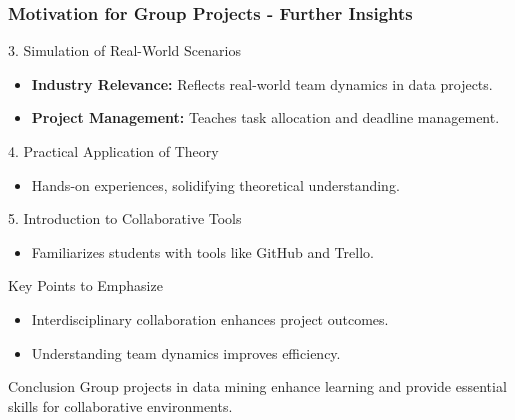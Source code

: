 \documentclass[aspectratio=169]{beamer}
\begin{document}
\begin{frame}[fragile]
    \frametitle{Motivation for Group Projects - Further Insights}
    \begin{block}{3. Simulation of Real-World Scenarios}
        \begin{itemize}
            \item \textbf{Industry Relevance:} Reflects real-world team dynamics in data projects.
            \item \textbf{Project Management:} Teaches task allocation and deadline management.
        \end{itemize}
    \end{block}

    \begin{block}{4. Practical Application of Theory}
        \begin{itemize}
            \item Hands-on experiences, solidifying theoretical understanding.
        \end{itemize}
    \end{block}

    \begin{block}{5. Introduction to Collaborative Tools}
        \begin{itemize}
            \item Familiarizes students with tools like GitHub and Trello.
        \end{itemize}
    \end{block}

    \begin{block}{Key Points to Emphasize}
        \begin{itemize}
            \item Interdisciplinary collaboration enhances project outcomes.
            \item Understanding team dynamics improves efficiency.
        \end{itemize}
    \end{block}

    \begin{block}{Conclusion}
        Group projects in data mining enhance learning and provide essential skills for collaborative environments.
    \end{block}
\end{frame}
\end{document}
